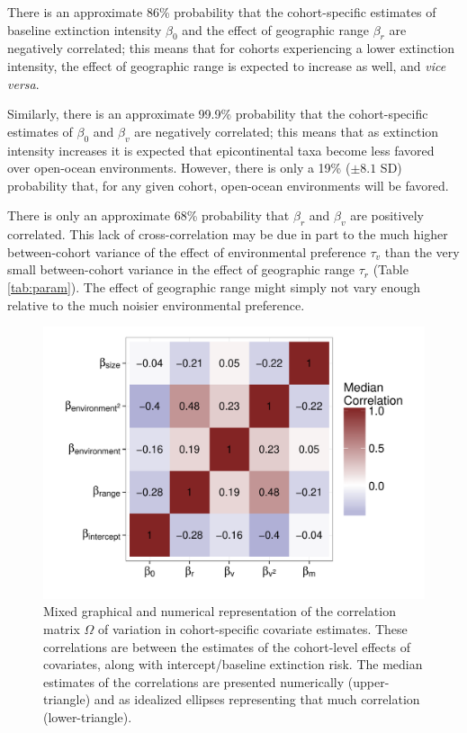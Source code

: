 \documentclass{article}
\begin{document}
There is an approximate 86\% probability that the cohort-specific estimates of baseline extinction intensity \(\beta_{0}\) and the effect of geographic range \(\beta_{r}\) are negatively correlated; this means that for cohorts experiencing a lower extinction intensity, the effect of geographic range is expected to increase as well, and \textit{vice versa}. 

Similarly, there is an approximate 99.9\% probability that the cohort-specific estimates of \(\beta_{0}\) and \(\beta_{v}\) are negatively correlated; this means that as extinction intensity increases it is expected that epicontinental taxa become less favored over open-ocean environments. However, there is only a 19\% (\(\pm 8.1\) SD) probability that, for any given cohort, open-ocean environments will be favored.

There is only an approximate 68\% probability that \(\beta_{r}\) and \(\beta_{v}\) are positively correlated. This lack of cross-correlation may be due in part to the much higher between-cohort variance of the effect of environmental preference \(\tau_{v}\) than the very small between-cohort variance in the effect of geographic range \(\tau_{r}\) (Table \ref{tab:param}). The effect of geographic range might simply not vary enough relative to the much noisier environmental preference. 

\begin{figure}[ht]
  \centering
  \includegraphics[height = 0.8\textheight,width=\textwidth,keepaspectratio=true]{figure/wei_cor_heatmap}
  \caption{Mixed graphical and numerical representation of the correlation matrix \(\Omega\) of variation in cohort-specific covariate estimates. These correlations are between the estimates of the cohort-level effects of covariates, along with intercept/baseline extinction risk. The median estimates of the correlations are presented numerically (upper-triangle) and as idealized ellipses representing that much correlation (lower-triangle).}
  \label{fig:cor_posterior}
\end{figure}
\end{document}
